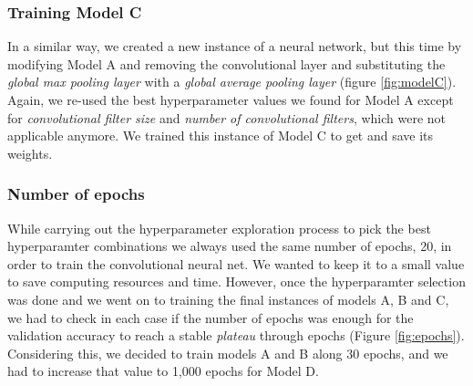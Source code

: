 \documentclass[10pt,journal,compsoc, onecolumn]{IEEEtran}
\begin{document}
\subsubsection{Training Model C}

In a similar way, we created a new instance of a neural network, but this time by modifying Model A and removing the convolutional layer and substituting the \textit{global max pooling layer} with a \textit{global average pooling layer} (figure \ref{fig:modelC}). Again, we re-used the best hyperparameter values we found for Model A except for \textit{convolutional filter size} and \textit{number of convolutional filters}, which were not applicable anymore. We trained this instance of Model C to get and save its weights.


\subsubsection{Number of epochs}

While carrying out the hyperparameter exploration process to pick the best hyperparamter combinations we always used the same number of epochs, 20, in order to train the convolutional neural net. We wanted to keep it to a small value to save computing resources and time. However, once the hyperparamter selection was done and we went on to training the final instances of models A, B and C, we had to check in each case if the number of epochs was enough for the validation accuracy to reach a stable \textit{plateau} through epochs (Figure \ref{fig:epochs}). Considering this, we decided to train models A and B along 30 epochs, and we had to increase that value to 1,000 epochs for Model D. 
\end{document}
